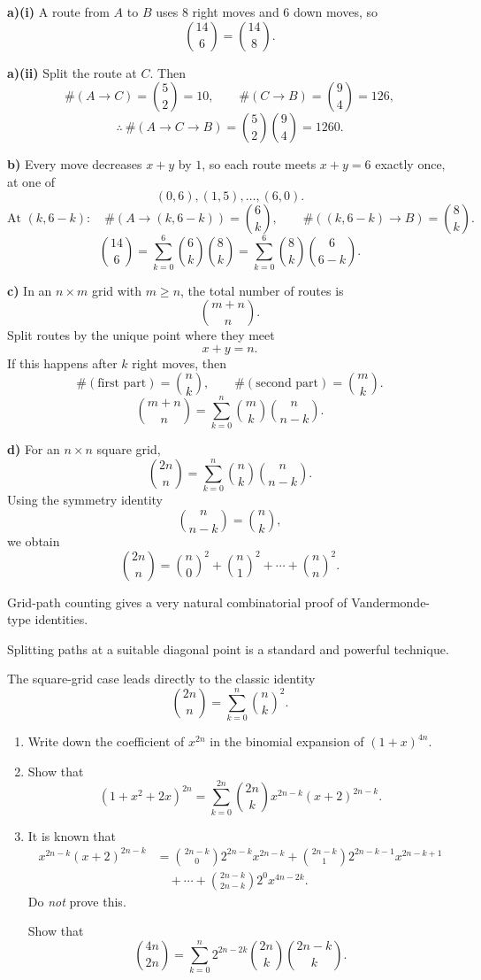 \begin{solution}
\textbf{a)(i)} A route from $A$ to $B$ uses $8$ right moves and $6$ down moves, so
\[
\binom{14}{6}=\binom{14}{8}.
\]

\textbf{a)(ii)} Split the route at $C$. Then
\[
\#(A\to C)=\binom{5}{2}=10,
\qquad
\#(C\to B)=\binom{9}{4}=126,
\]
\[
\therefore\ \#(A\to C\to B)=\binom{5}{2}\binom{9}{4}=1260.
\]

\textbf{b)} Every move decreases $x+y$ by $1$, so each route meets $x+y=6$ exactly once, at one of
\[
(0,6),(1,5),\dots,(6,0).
\]
\[
\text{At }(k,6-k):\quad \#(A\to(k,6-k))=\binom{6}{k},\qquad \#((k,6-k)\to B)=\binom{8}{k}.
\]
\[
\binom{14}{6}
=
\sum_{k=0}^{6}\binom{6}{k}\binom{8}{k}
=
\sum_{k=0}^{6}\binom{8}{k}\binom{6}{6-k}.
\]

\textbf{c)} In an $n\times m$ grid with $m\ge n$, the total number of routes is
\[
\binom{m+n}{n}.
\]
Split routes by the unique point where they meet
\[
x+y=n.
\]
If this happens after $k$ right moves, then
\[
\#(\text{first part})=\binom{n}{k},
\qquad
\#(\text{second part})=\binom{m}{k}.
\]
\[
\binom{m+n}{n}
=
\sum_{k=0}^{n}\binom{m}{k}\binom{n}{n-k}.
\]

\textbf{d)} For an $n\times n$ square grid,
\[
\binom{2n}{n}
=
\sum_{k=0}^{n}\binom{n}{k}\binom{n}{n-k}.
\]
Using the symmetry identity
\[
\binom{n}{n-k}=\binom{n}{k},
\]
we obtain
\[
\boxed{
\binom{2n}{n}
=
\binom{n}{0}^2+\binom{n}{1}^2+\cdots+\binom{n}{n}^2.
}
\]
\end{solution}

\begin{takeaways}
\item Grid-path counting gives a very natural combinatorial proof of Vandermonde-type identities.
\item Splitting paths at a suitable diagonal point is a standard and powerful technique.
\item The square-grid case leads directly to the classic identity
\[
\binom{2n}{n}=\sum_{k=0}^n \binom{n}{k}^2.
\]
\end{takeaways}

\begin{problem}
\begin{enumerate}
  \item[(i)] Write down the coefficient of $x^{2n}$ in the binomial expansion of $(1+x)^{4n}$.

  \item[(ii)] Show that
  \[
  (1+x^2+2x)^{2n}=\sum_{k=0}^{2n}\binom{2n}{k}x^{2n-k}(x+2)^{2n-k}.
  \]

  \item[(iii)] It is known that
  \[
  \begin{aligned}
  x^{2n-k}(x+2)^{2n-k}
  &= \binom{2n-k}{0}2^{2n-k}x^{2n-k}
  +\binom{2n-k}{1}2^{2n-k-1}x^{2n-k+1} \\
  &\quad +\cdots
  +\binom{2n-k}{2n-k}2^0x^{4n-2k}.
  \end{aligned}
  \]
  Do \emph{not} prove this.

  Show that
  \[
  \binom{4n}{2n}
  =\sum_{k=0}^{n}2^{2n-2k}\binom{2n}{k}\binom{2n-k}{k}.
  \]
\end{enumerate}
\end{problem}

